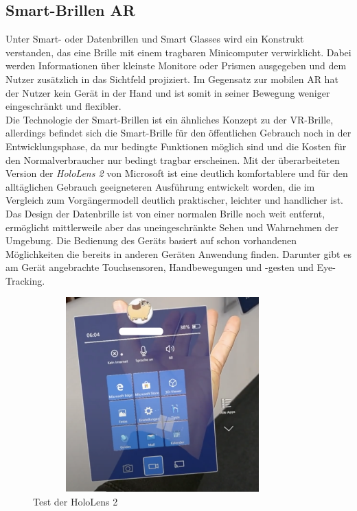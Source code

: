 \subsection*{Smart-Brillen AR}
\label{sec:smart-glasses}
Unter Smart- oder Datenbrillen und Smart Glasses wird ein Konstrukt verstanden, das eine Brille mit einem tragbaren Minicomputer verwirklicht. 
Dabei werden Informationen über kleinste Monitore oder Prismen ausgegeben und dem Nutzer zusätzlich in das Sichtfeld projiziert. Im Gegensatz
zur mobilen \acs{AR} hat der Nutzer kein Gerät in der Hand und ist somit in seiner Bewegung weniger eingeschränkt und flexibler. 
\\ 
\linebreak
Die Technologie der Smart-Brillen ist ein ähnliches Konzept zu der \acs{VR}-Brille, allerdings befindet sich die Smart-Brille für den 
öffentlichen Gebrauch noch in der Entwicklungsphase, da nur bedingte Funktionen möglich sind und die Kosten für den Normalverbraucher nur 
bedingt tragbar erscheinen. Mit der überarbeiteten Version der \textit{HoloLens 2} von Microsoft ist eine deutlich komfortablere und für 
den alltäglichen Gebrauch geeigneteren Ausführung entwickelt worden, die im Vergleich zum Vorgängermodell deutlich praktischer, leichter und handlicher ist. 
Das Design der Datenbrille ist von einer normalen Brille noch weit entfernt, ermöglicht mittlerweile aber das 
uneingeschränkte Sehen und Wahrnehmen der Umgebung. Die Bedienung des Geräts basiert auf schon vorhandenen Möglichkeiten die bereits in anderen 
Geräten Anwendung finden. Darunter gibt es am Gerät angebrachte Touchsensoren, Handbewegungen und -gesten und Eye-Tracking. 
\begin{figure}[hbt!]
    \centering
    \includegraphics[width=10cm,height=7.5cm,keepaspectratio]{2Grundlagen/Bilder/smartglassAW.png}
    \caption{Test der HoloLens 2}
    \label{pic:testholo}
\end{figure}
